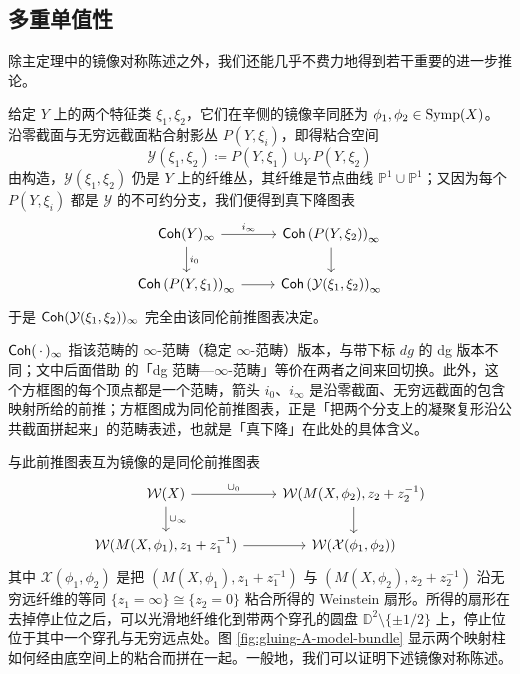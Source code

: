 \subsection{多重单值性}

除主定理中的镜像对称陈述之外，我们还能几乎不费力地得到若干重要的进一步推论。

给定 $Y$ 上的两个特征类 $\xi_1,\xi_2$，它们在辛侧的镜像辛同胚为 $\phi_1,\phi_2\in\operatorname{Symp} (X)$。沿零截面与无穷远截面粘合射影丛 $P(Y,\xi_i)$，即得粘合空间
\[
    \mathcal{Y} (\xi_1, \xi_2)\coloneqq P(Y,\xi_1)\cup_Y P(Y,\xi_2)
\]
由构造，$\mathcal{Y} (\xi_1,\xi_2)$ 仍是 $Y$ 上的纤维丛，其纤维是节点曲线 $\mathbb{P}^1\cup\mathbb{P}^1$；又因为每个 $P(Y,\xi_i)$ 都是 $\mathcal{Y}$ 的不可约分支，我们便得到真下降图表
\[
\begin{tikzcd}
    \Coh (Y)_{\infty}\arrow[r,"i_{\infty}"]\arrow[d,"i_0"]& \Coh\left(P(Y,\xi_2)\right)_{\infty}\arrow[d]\\ 
    \Coh\left(P(Y,\xi_1)\right)_{\infty}\arrow[r]&\Coh\left(\mathcal{Y} (\xi_1,\xi_2)\right)_{\infty}
\end{tikzcd}
\]
于是 $\operatorname{\mathsf{Coh}} (\mathcal{Y} (\xi_1, \xi_2))_{\infty}$ 完全由该同伦前推图表决定。

\begin{yizhu}
$\operatorname{\mathsf{Coh}}(\,\cdot\,)_{\infty}$ 指该范畴的 $\infty$-范畴（稳定 $\infty$-范畴）版本，与带下标 $dg$ 的 dg 版本不同；文中后面借助 \cite{Cohn16} 的「dg 范畴—$\infty$-范畴」等价在两者之间来回切换。此外，这个方框图的每个顶点都是一个范畴，箭头 $i_0$、$i_\infty$ 是沿零截面、无穷远截面的包含映射所给的前推；方框图成为同伦前推图表，正是「把两个分支上的凝聚复形沿公共截面拼起来」的范畴表述，也就是「真下降」在此处的具体含义。
\end{yizhu}

与此前推图表互为镜像的是同伦前推图表
\[
    \begin{tikzcd}
        \mathcal{W} (X)\arrow[r,"\cup_0"]\arrow[d,"\cup_{\infty}"]&\mathcal{W} (M(X,\phi_2),z_2+z_2^{-1})\arrow[d]\\ 
        \mathcal{W} (M(X,\phi_1),z_1+z_1^{-1})\arrow[r]&\mathcal{W} (\mathcal{X} (\phi_1,\phi_2))
    \end{tikzcd}
\]
其中 $\mathcal{X} (\phi_1,\phi_2)$ 是把 $\left(M(X,\phi_1),z_1+z_1^{-1}\right)$ 与 $\left(M(X,\phi_2),z_2+z_2^{-1}\right)$ 沿无穷远纤维的等同 $\{z_1=\infty\}\cong\{z_2=0\}$ 粘合所得的 Weinstein 扇形。所得的扇形在去掉停止位之后，可以光滑地纤维化到带两个穿孔的圆盘 $\mathbb{D}^2\setminus\{\pm 1/2\}$ 上，停止位位于其中一个穿孔与无穷远点处。图 \ref{fig:gluing-A-model-bundle} 显示两个映射柱如何经由底空间上的粘合而拼在一起。一般地，我们可以证明下述镜像对称陈述。

